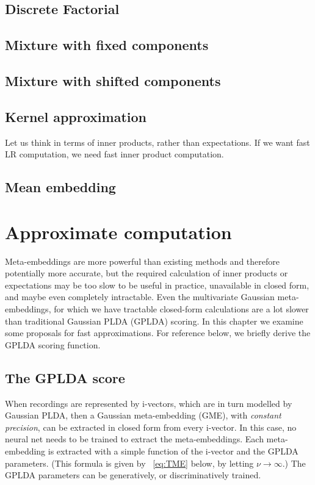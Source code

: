 \documentclass[a4paper,oneside,12pt,english]{report}
\begin{document}
 


\section{Discrete Factorial}

\section{Mixture with fixed components}

\section{Mixture with shifted components}


\section{Kernel approximation}
Let us think in terms of inner products, rather than expectations. If we want fast LR computation, we need fast inner product computation. 



\section{Mean embedding}


\chapter{Approximate computation}
\label{chap:approx}
Meta-embeddings are more powerful than existing methods and therefore potentially more accurate, but the required calculation of inner products or expectations may be too slow to be useful in practice, unavailable in closed form, and maybe even completely intractable. Even the multivariate Gaussian meta-embeddings, for which we have tractable closed-form calculations are a lot slower than traditional Gaussian PLDA (GPLDA) scoring. In this chapter we examine some proposals for fast approximations. For reference below, we briefly derive the GPLDA scoring function.


\section{The GPLDA score}
When recordings are represented by i-vectors, which are in turn modelled by Gaussian PLDA, then a Gaussian meta-embedding (GME), with \emph{constant precision}, can be extracted in closed form from every i-vector. In this case, no neural net needs to be trained to extract the meta-embeddings. Each meta-embedding is extracted with a simple function of the i-vector and the GPLDA parameters. (This formula is given by ~\eqref{eq:TME} below, by letting $\nu\to\infty$.) The GPLDA parameters can be generatively, or discriminatively trained. 
\end{document}
